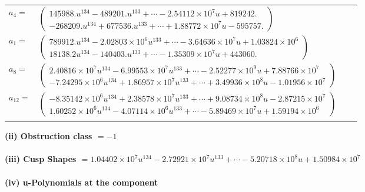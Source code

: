 \documentclass[1p]{elsarticle_modified}
\theoremstyle{definition}
\begin{document}
\begin{tabular}{m{7pt} m{180pt} m{7pt} m{180pt} }
\flushright $a_{4}=$&$\begin{pmatrix}145988. u^{134}-489201. u^{133}+\cdots-2.54112\times10^{7} u+819242.\\-268209. u^{134}+677536. u^{133}+\cdots+1.88772\times10^{7} u-595757.\end{pmatrix}$ \\
\flushright $a_{1}=$&$\begin{pmatrix}789912. u^{134}-2.02803\times10^{6} u^{133}+\cdots-3.64636\times10^{7} u+1.03824\times10^{6}\\18138.2 u^{134}-140403. u^{133}+\cdots-1.35309\times10^{7} u+443060.\end{pmatrix}$ \\
\flushright $a_{8}=$&$\begin{pmatrix}2.40816\times10^{7} u^{134}-6.99553\times10^{7} u^{133}+\cdots-2.52277\times10^{9} u+7.88766\times10^{7}\\-7.24295\times10^{6} u^{134}+1.86957\times10^{7} u^{133}+\cdots+3.49936\times10^{8} u-1.01956\times10^{7}\end{pmatrix}$ \\
\flushright $a_{12}=$&$\begin{pmatrix}-8.35142\times10^{6} u^{134}+2.38578\times10^{7} u^{133}+\cdots+9.08734\times10^{8} u-2.87215\times10^{7}\\1.60252\times10^{6} u^{134}-4.07114\times10^{6} u^{133}+\cdots-5.89469\times10^{7} u+1.59194\times10^{6}\end{pmatrix}$\\&\end{tabular}
\flushleft \textbf{(ii) Obstruction class $= -1$}\\~\\
\flushleft \textbf{(iii) Cusp Shapes $= 1.04402\times10^{7} u^{134}-2.72921\times10^{7} u^{133}+\cdots-5.20718\times10^{8} u+1.50984\times10^{7}$}\\~\\
\newpage\renewcommand{\arraystretch}{1}
\flushleft \textbf{(iv) u-Polynomials at the component}\newline \\
\end{document}
